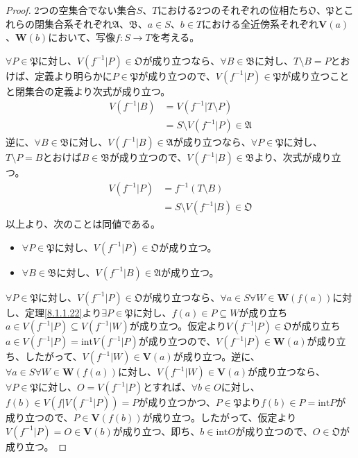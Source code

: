 \documentclass[dvipdfmx]{jsarticle}
\begin{document}
\begin{proof}
2つの空集合でない集合$S$、$T$における2つのそれぞれの位相たち$\mathfrak{O}$、$\mathfrak{P}$とこれらの閉集合系それぞれ$\mathfrak{A}$、$\mathfrak{B}$、$a \in S$、$b \in T$における全近傍系それぞれ$\mathbf{V}(a)$、$\mathbf{W}(b)$において、写像$f:S \rightarrow T$を考える。\par
$\forall P \in \mathfrak{P}$に対し、$V\left( f^{- 1}|P \right)\in \mathfrak{O}$が成り立つなら、$\forall B \in \mathfrak{B}$に対し、$T \setminus B = P$とおけば、定義より明らかに$P \in \mathfrak{P}$が成り立つので、$V\left( f^{- 1}|P \right) \in \mathfrak{P}$が成り立つことと閉集合の定義より次式が成り立つ。
\begin{align*}
V\left( f^{- 1}|B \right) &= V\left( f^{- 1}|T \setminus P \right)\\
&= S \setminus V\left( f^{- 1}|P \right) \in \mathfrak{A}
\end{align*}
逆に、$\forall B \in \mathfrak{B}$に対し、$V\left( f^{- 1}|B \right)\in \mathfrak{A}$が成り立つなら、$\forall P \in \mathfrak{P}$に対し、$T \setminus P = B$とおけば$B \in \mathfrak{B}$が成り立つので、$V\left( f^{- 1}|B \right) \in \mathfrak{B}$より、次式が成り立つ。
\begin{align*}
V\left( f^{- 1}|P \right) &= f^{- 1}(T \setminus B)\\
&= S \setminus V\left( f^{- 1}|B \right) \in \mathfrak{O}
\end{align*}
以上より、次のことは同値である。
\begin{itemize}
\item
  $\forall P \in \mathfrak{P}$に対し、$V\left( f^{- 1}|P \right)\in \mathfrak{O}$が成り立つ。
\item
  $\forall B \in \mathfrak{B}$に対し、$V\left( f^{- 1}|B \right)\in \mathfrak{A}$が成り立つ。
\end{itemize}\par
$\forall P \in \mathfrak{P}$に対し、$V\left( f^{- 1}|P \right)\in \mathfrak{O}$が成り立つなら、$\forall a \in S\forall W \in \mathbf{W}\left( f(a) \right)$に対し、定理\ref{8.1.1.22}より$\exists P \in \mathfrak{P}$に対し、$f(a) \in P \subseteq W$が成り立ち$a \in V\left( f^{- 1}|P \right) \subseteq V\left( f^{- 1}|W \right)$が成り立つ。仮定より$V\left( f^{- 1}|P \right) \in \mathfrak{O}$が成り立ち$a \in V\left( f^{- 1}|P \right) = {\mathrm{int}}{V\left( f^{- 1}|P \right)}$が成り立つので、$V\left( f^{- 1}|P \right) \in \mathbf{W}(a)$が成り立ち、したがって、$V\left( f^{- 1}|W \right) \in \mathbf{V}(a)$が成り立つ。逆に、$\forall a \in S\forall W \in \mathbf{W}\left( f(a) \right)$に対し、$V\left( f^{- 1}|W \right) \in \mathbf{V}(a)$が成り立つなら、$\forall P\in \mathfrak{P}$に対し、$O = V\left( f^{- 1}|P \right)$とすれば、$\forall b \in O$に対し、$f(b) \in V\left( f|V\left( f^{- 1}|P \right) \right) = P$が成り立つかつ、$P \in \mathfrak{P}$より$f(b) \in P = {\mathrm{int}}P$が成り立つので、$P \in \mathbf{V}\left( f(b) \right)$が成り立つ。したがって、仮定より$V\left( f^{- 1}|P \right) = O \in \mathbf{V}(b)$が成り立つ、即ち、$b \in {\mathrm{int}}O$が成り立つので、$O \in \mathfrak{O}$が成り立つ。\par

\end{proof}
\end{document}
